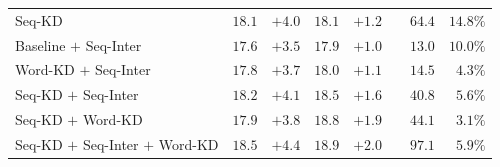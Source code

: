 \documentclass[11pt,letterpaper]{article}
\begin{document}
\begin{table}[!ht]
\begin{tabular}{l c c  c c r r r }
\hspace{4mm}  Seq-KD  & $18.1$ & $+4.0$& $18.1$& $+1.2$&  & $64.4$ & $14.8\%$  \\
 \hspace{4mm} Baseline $+$ Seq-Inter  & $17.6$ & $+3.5$& $17.9$& $+1.0$&  & $13.0$ & $10.0\%$ \\
\hspace{4mm} Word-KD $+$ Seq-Inter   & $17.8$ & $+3.7$& $18.0$& $+1.1$& & $14.5$ & $4.3\%$ \\
\hspace{4mm}  Seq-KD $+$ Seq-Inter  & $18.2$ & $+4.1$& $18.5$& $+1.6$&  & $40.8$ & $5.6\%$ \\
\hspace{4mm} Seq-KD $+$ Word-KD & $17.9$ & $+3.8$& $18.8$& $+1.9$& & $44.1$ & $3.1\%$  \\
\hspace{4mm} Seq-KD $+$ Seq-Inter $+$ Word-KD  & $18.5$ & $+\mathbf{4.4}$& $18.9$& $+\mathbf{2.0}$& & $97.1$& $5.9\%$  \\


\end{tabular}
\end{table}
\end{document}
